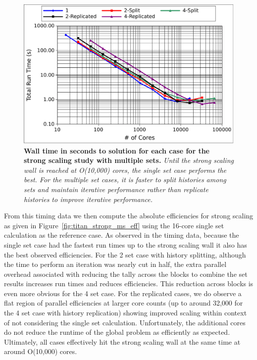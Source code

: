 \begin{figure}[t!]
  \begin{center}
    \includegraphics[width=6in]{chapters/parallel_mc/titan_strong_ms_time.pdf}
  \end{center}
  \caption{\textbf{Wall time in seconds to solution for each case for
      the strong scaling study with multiple sets.} \textit{Until the
      strong scaling wall is reached at O(10,000) cores, the single
      set case performs the best. For the multiple set cases, it is
      faster to split histories among sets and maintain iterative
      performance rather than replicate histories to improve iterative
      performance.}}
  \label{fig:titan_strong_ms_time}
\end{figure}

From this timing data we then compute the absolute efficiencies for
strong scaling as given in Figure~\ref{fig:titan_strong_ms_eff} using
the 16-core single set calculation as the reference case. As observed
in the timing data, because the single set case had the fastest run
times up to the strong scaling wall it also has the best observed
efficiencies. For the 2 set case with history splitting, although the
time to perform an iteration was nearly cut in half, the extra
parallel overhead associated with reducing the tally across the blocks
to combine the set results increases run times and reduces
efficiencies. This reduction across blocks is even more obvious for
the 4 set case. For the replicated cases, we do observe a flat region
of parallel efficiencies at larger core counts (up to around 32,000
for the 4 set case with history replication) showing improved scaling
within context of not considering the single set
calculation. Unfortunately, the additional cores do not reduce the
runtime of the global problem as efficiently as expected. Ultimately,
all cases effectively hit the strong scaling wall at the same time at
around O(10,000) cores.

